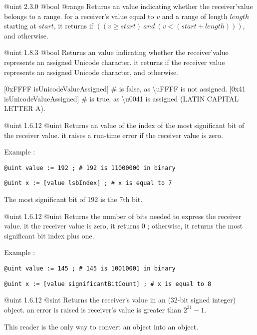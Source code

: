 {@uint}
{2.3.0}
{@bool}
{@range}
{Returns an  value indicating whether the receiver'value belongs to a range.}
{for a receiver's value equal to $v$ and a range of length $length$ starting at $start$, it returns  if $((v \geqslant start)~and~(v<(start+length)))$, and  otherwise.}



{@uint}
{1.8.3}
{@bool}
{Returns an  value indicating whether the receiver'value represents an assigned Unicode character.}
{it returns  if the receiver value represents an assigned Unicode character,  and otherwise.}

\exempleDeuxLignes
{}
{[0xFFFF isUnicodeValueAssigned] \# is false, as \textbackslash uFFFF is not assigned.}
{[0x41 isUnicodeValueAssigned] \# is true, as \textbackslash u0041 is assigned (LATIN CAPITAL LETTER A).}



{@uint}
{1.6.12}
{@uint}
{Returns an  value of the index of the most significant bit of the receiver value.}
{it raises a run-time error if the receiver value is zero.}

Example :

\texttt{@uint value := 192 ; \# 192 is 11000000 in binary}

\texttt{@uint x := [value lsbIndex] ; \# x is equal to 7}

The most significant bit of 192 is the 7th bit.




{@uint}
{1.6.12}
{@uint}
{Returns the number of bits needed to express the receiver value.}
{it the receiver value is zero, it returns 0 ; otherwise, it returns the most significant bit index plus one.}

Example :

\texttt{@uint value := 145 ; \# 145 is 10010001 in binary}

\texttt{@uint x := [value significantBitCount] ; \# x is equal to 8}





{@uint}
{1.6.12}
{@sint}
{Returns the receiver's value in an  (32-bit signed integer) object.}
{an error is raised is receiver's value is greater than $2^{31}-1$.}

This reader is the only way to convert an  object into an  object.




